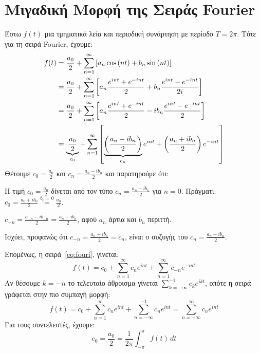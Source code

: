   \section{Μιγαδική Μορφή της Σειράς Fourier}



  Έστω $f(t)$ μια τμηματικά λεία και περιοδική συνάρτηση με περίοδο $ T=2 \pi $. Τότε 
  για τη σειρά Fourier, έχουμε:
  \begin{align}
    \label{eq:fouri}
    f(t) &= \frac{a_{0}}{2} + \sum_{n=1}^{\infty} \left[a_{n} \cos{(nt)} + b_{n} \sin{(nt)}\right] \notag \\
         &= \frac{a_{0}}{2} + \sum_{n=1}^{\infty} \left[a_{n} \frac{e^{int}+e^{-int}}{2} + b_{n} \frac{e^{int}-e^{-int}}{2i} \right] \notag \\
         &= \frac{a_{0}}{2} + \sum_{n=1}^{\infty} \left[a_{n} \frac{e^{int}+e^{-int}}{2} - i b_{n} \frac{e^{int}-e^{-int}}{2}\right] \notag \\
         &= \underbrace{\frac{a_{0}}{2}}_{c_{0}} + \sum_{n=1}^{\infty} \left[\underbrace{\left(\frac{a_{n}-ib_{n}}{2}\right)}_{c_{n}}e^{int} +
         \left(\frac{a_{n}+ib_{n}}{2}\right) e^{-int}\right]
  \end{align}
  Θέτουμε $ c_{0} = \frac{a_{0}}{2} $ και $ c_{n} = \frac{a_{n}-ib_{n}}{2} $ και
  παρατηρούμε ότι:
  \begin{myitemize}
    \item Η τιμή $ c_{0} = \frac{a_{0}}{2} $ δίνεται από τον τύπο $ c_{n} =
      \frac{a_{n}- ib_{n}}{2} $ για $ n=0 $. Πράγματι: 
      $ c_{0} = \frac{a_{0}+ib_{0}}{2} \overset{b_{0}=0}{=} \frac{a_{0}}{2}$.
    \item 
      $ c_{-n} = \frac{a_{-n}-ib_{-n}}{2} = \frac{a_{n}+ib_{n}}{2} $, αφού 
      $ a_{n} $ άρτια και $ b_{n} $ περιττή.
    \item Ισχύει, προφανώς ότι $ c_{-n} = \frac{a_{n}+ib_{n}}{2} = \overline{c_{n}}
      $, είναι ο συζυγής του $ c_{n} = \frac{a_{n}-i b_{n}}{2} $.
  \end{myitemize}
  Επομένως, η σειρά~\eqref{eq:fouri}, γίνεται:
  \[
    f(t) = c_{0} + \sum_{n=1}^{\infty} c_{n} e^{int} + \sum_{n=1}^{\infty} c_{-n}
    e^{-int} 
  \] 
  Αν θέσουμε $ k=-n $ το τελευταίο άθροισμα γίνεται $ \sum_{k=-\infty}^{-1} c_{k}
  e^{ikt} $, οπότε η σειρά γράφεται στην πιο συμπαγή μορφή:
  \[
    f(t) = c_{0} + \sum_{n=1}^{\infty} c_{n} e^{int} + \sum_{n=-\infty}^{-1} c_{n}
    e^{int} = \sum_{n=- \infty}^{\infty} c_{n} e^{int}
  \]
  Για τους συντελεστές, έχουμε:
  \[
    c_{0} = \frac{a_{0}}{2} = \frac{1}{2\pi} \int _{- \pi }^{\pi} f(t) \,{dt}
  \] 
